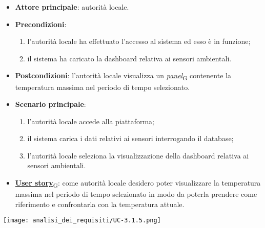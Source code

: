 \begin{itemize}
	\item \textbf{Attore principale}: autorità locale.
	\item \textbf{Precondizioni}:
	      \begin{enumerate}
		      \item l'autorità locale ha effettuato l'accesso al sistema ed esso è in funzione;
		      \item il sistema ha caricato la dashboard relativa ai sensori ambientali.
	      \end{enumerate}
	\item \textbf{Postcondizioni}: l'autorità locale visualizza un \href{https://7last.github.io/docs/pb/documentazione-interna/glossario\#panel}{\textit{panel}\textsubscript{G}} contenente la temperatura massima nel periodo di tempo selezionato.
	\item \textbf{Scenario principale}:
	      \begin{enumerate}
		      \item l'autorità locale accede alla piattaforma;
		      \item il sistema carica i dati relativi ai sensori interrogando il database;
		      \item l'autorità locale seleziona la visualizzazione della dashboard relativa ai sensori ambientali.
	      \end{enumerate}
	\item \href{https://7last.github.io/docs/pb/documentazione-interna/glossario\#user-story}{\textbf{User story}\textsubscript{G}}:
	      come autorità locale desidero poter visualizzare la temperatura massima nel periodo di tempo selezionato
	      in modo da poterla prendere come riferimento e confrontarla con la temperatura attuale.
\end{itemize}
\begin{center}
	\texttt{[image: analisi\_dei\_requisiti/UC-3.1.5.png]}
\end{center}


